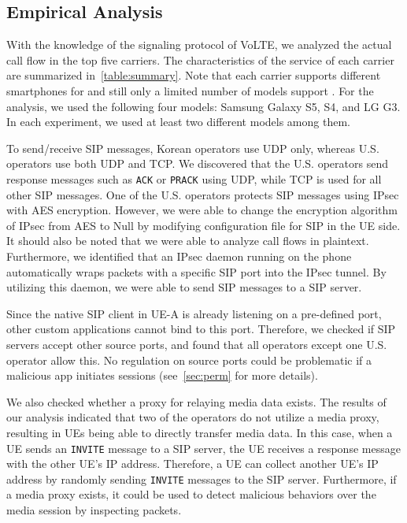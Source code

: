 \subsection{Empirical Analysis}
\label{sec:impl_anal}

With the knowledge of the signaling protocol of VoLTE, we analyzed the actual call
flow in the top five carriers. The characteristics of the service
of each carrier are summarized in~\autoref{table:summary}. Note that each carrier
supports different smartphones for \vt and still only a limited number
of models support \vt. For the analysis, we used the following four
models: Samsung Galaxy S5, S4, and LG G3. In each experiment, we
used at least two different models among them.


  To send/receive SIP messages, Korean operators use UDP
only, whereas U.S. operators use both UDP and TCP. We discovered that the U.S.
operators send response messages such as {\tt ACK} or {\tt PRACK} using UDP,
while TCP is used for all other SIP messages. One of the U.S. operators protects
SIP messages using IPsec with AES encryption. However, we were able to change
the encryption algorithm of IPsec from AES to Null by modifying configuration
file for SIP in the UE side. It should also be noted that we were able to
analyze call flows in plaintext.  Furthermore, we identified that an IPsec
daemon running on the phone automatically wraps packets with a specific SIP port
into the IPsec tunnel. By utilizing this daemon, we were able to send SIP
messages to a SIP server.

Since the native SIP client in UE-A is already listening on a pre-defined port,
other custom applications cannot bind to this port. Therefore, we checked if SIP
servers accept other source ports, and found that all operators except one U.S.
operator allow this. No regulation on source ports could be problematic if a
malicious app initiates \vt sessions (see~\autoref{sec:perm} for more details).

We also checked whether a proxy for relaying media data exists. The results of our
analysis indicated that two of the operators do not utilize a media proxy, resulting in
UEs being able to directly transfer media data. In this case, when a UE sends an
{\tt INVITE} message to a SIP server, the UE receives a response message with the
other UE\rq{s} IP address. Therefore, a UE can collect another UE\rq{s} IP
address by randomly sending {\tt INVITE} messages to the SIP server.
Furthermore, if a media proxy exists, it could be used to detect malicious
behaviors over the media session by inspecting packets.


